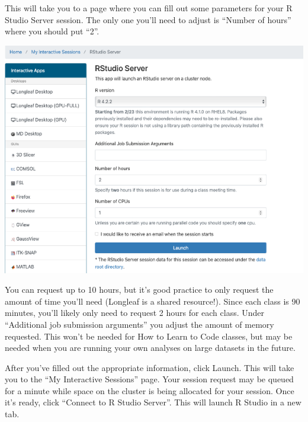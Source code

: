 \documentclass[
  letterpaper,
  DIV=11,
  numbers=noendperiod]{scrreprt}
\begin{document}
This will take you to a page where you can fill out some parameters for
your R Studio Server session. The only one you'll need to adjust is
``Number of hours'' where you should put ``2''.

\begin{center}
\includegraphics{scripts/00_intro/class0_images/Picture2.png}
\end{center}

\begin{tcolorbox}[enhanced jigsaw, bottomtitle=1mm, bottomrule=.15mm, toprule=.15mm, opacityback=0, leftrule=.75mm, breakable, colback=white, toptitle=1mm, left=2mm, coltitle=black, titlerule=0mm, opacitybacktitle=0.6, title=\textcolor{quarto-callout-note-color}{\faInfo}\hspace{0.5em}{Note}, rightrule=.15mm, arc=.35mm, colframe=quarto-callout-note-color-frame, colbacktitle=quarto-callout-note-color!10!white]

You can request up to 10 hours, but it's good practice to only request
the amount of time you'll need (Longleaf is a shared resource!). Since
each class is 90 minutes, you'll likely only need to request 2 hours for
each class. Under ``Additional job submission arguments'' you adjust the
amount of memory requested. This won't be needed for How to Learn to
Code classes, but may be needed when you are running your own analyses
on large datasets in the future.

\end{tcolorbox}

After you've filled out the appropriate information, click Launch. This
will take you to the ``My Interactive Sessions'' page. Your session
request may be queued for a minute while space on the cluster is being
allocated for your session. Once it's ready, click ``Connect to R Studio
Server''. This will launch R Studio in a new tab.
\end{document}
